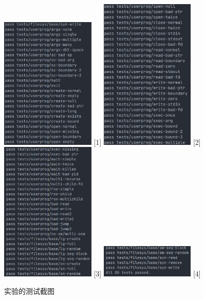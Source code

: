 \documentclass{article}
\begin{document}
\begin{figure}[H]
  \centering
  \subfloat
  {\includegraphics[width=0.4\textwidth]{img/2.png}}
  [1]     %
  \subfloat
  {\includegraphics[width=0.4\textwidth]{img/3.png}}
  [2]
  \subfloat
  {\includegraphics[width=0.4\textwidth]{img/4.png}}
  [3]
  \subfloat
  {\includegraphics[width=0.4\textwidth]{img/5.png}}
  [4]
  \caption{实验的测试截图}
\end{figure}
\end{document}
